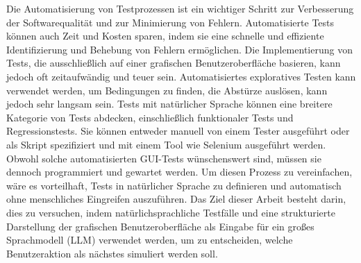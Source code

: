 
\Abstract
Die Automatisierung von Testprozessen ist ein wichtiger Schritt zur Verbesserung der Softwarequalität und zur Minimierung von Fehlern.
Automatisierte Tests können auch Zeit und Kosten sparen, indem sie eine schnelle und effiziente Identifizierung und Behebung von Fehlern ermöglichen.
Die Implementierung von Tests, die ausschließlich auf einer grafischen Benutzeroberfläche basieren, kann jedoch oft zeitaufwändig und teuer sein.
Automatisiertes exploratives Testen kann verwendet werden, um Bedingungen zu finden, die Abstürze auslösen, kann jedoch sehr langsam sein.
Tests mit natürlicher Sprache können eine breitere Kategorie von Tests abdecken, einschließlich funktionaler Tests und Regressionstests.
Sie können entweder manuell von einem Tester ausgeführt oder als Skript spezifiziert und mit einem Tool wie Selenium ausgeführt werden.
Obwohl solche automatisierten GUI-Tests wünschenswert sind, müssen sie dennoch programmiert und gewartet werden.
Um diesen Prozess zu vereinfachen, wäre es vorteilhaft, Tests in natürlicher Sprache zu definieren und automatisch ohne menschliches Eingreifen auszuführen.
Das Ziel dieser Arbeit besteht darin, dies zu versuchen, indem natürlichsprachliche Testfälle und eine strukturierte Darstellung der grafischen Benutzeroberfläche als Eingabe für ein großes Sprachmodell (LLM) verwendet werden, um zu entscheiden, welche Benutzeraktion als nächstes simuliert werden soll.